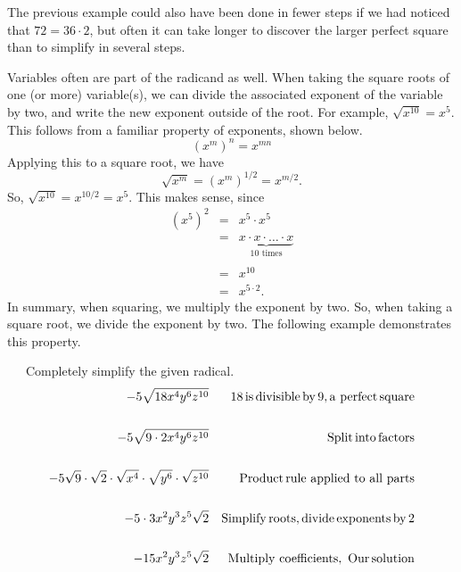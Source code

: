 The previous example could also have been done in fewer steps if we had noticed
that $72 = 36 \cdot 2$, but often it can take longer to discover the larger
perfect square than to simplify in several steps.\pp

\newpage

Variables often are part of the radicand as well. When taking the square
roots of one (or more) variable(s), we can divide the associated exponent of the variable by two, and write the new exponent outside of the root. For example, $\sqrt{x^{10}}= x^5$. This follows from a familiar property of exponents, shown below.
$$\left(x^m\right)^n=x^{mn}$$
Applying this to a square root, we have
$$\sqrt{x^m}=\left(x^m\right)^{1/2}=x^{m/2}.$$
So, $\sqrt{x^{10}}=x^{10/2} = x^5$.  This makes sense, since 
\begin{eqnarray*}
\left(x^5\right)^2 & = & x^5\cdot x^5\\
 & = & \underbrace{x\cdot x\cdot\ldots\cdot x}_{\text{10 times}}\\
 &&\\
 & = & x^{10}\\
 & = & x^{5\cdot 2}.
\end{eqnarray*}  
In summary, when squaring, we multiply the exponent by two.  So, when taking a square root, we divide the exponent by two.
The following example demonstrates this property.

\begin{example}~~~Completely simplify the given radical.
  \begin{eqnarray*}
    - 5 \sqrt{18 x^4 y^6 z^{10}} &  & 18 \operatorname{is} \operatorname{divisible} \operatorname{by}
    9, \operatorname{a~perfect} \operatorname{square}\\
    & & \\
		- 5 \sqrt{9 \cdot 2 x^4 y^6 z^{10}} &  & \operatorname{Split} \operatorname{into}
    \operatorname{factors}\\
    & & \\
		- 5 \sqrt{9} \cdot \sqrt{2} \cdot \sqrt{x^4} \cdot \sqrt{y^6} \cdot
    \sqrt{z^{10}} &  & \operatorname{Product} \operatorname{rule~applied~to~all~parts}\\
		& & \\
		- 5 \cdot 3 x^2 y^3 z^5 \sqrt{2} & & \operatorname{Simplify} \operatorname{roots}, \operatorname{divide} \operatorname{exponents} \operatorname{by} 2\\
    & & \\
		- 15 x^2 y^3 z^5 \sqrt{2} &  & \operatorname{Multiply~coefficients,~Our} \operatorname{solution}
  \end{eqnarray*}
\end{example}

